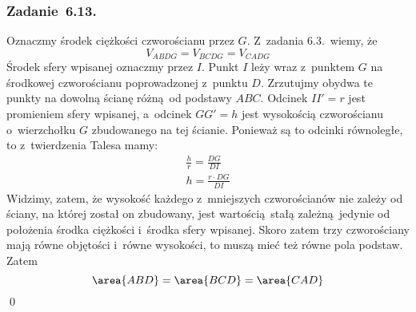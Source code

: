 \subsubsection*{Zadanie~6.13.}
Oznaczmy środek ciężkości czworościanu przez \(G\). Z~zadania 6.3.\ wiemy, że
\begin{equation*}
    V_{ABDG} = V_{BCDG} = V_{CADG}
\end{equation*}
Środek sfery wpisanej oznaczmy przez \(I\). Punkt \(I\) leży wraz z~punktem \(G\) na środkowej czworościanu poprowadzonej z~punktu \(D\). Zrzutujmy obydwa te punkty na dowolną ścianę różną od podstawy \(ABC\). Odcinek \(II' = r\) jest promieniem sfery wpisanej, a~odcinek \(GG' = h\) jest wysokością czworościanu o~wierzchołku \(G\) zbudowanego na tej ścianie. Ponieważ są to odcinki równoległe, to z~twierdzenia Talesa mamy:
\begin{gather*}
    \frac{h}{r} = \frac{DG}{DI}\\
    h = \frac{r \cdot DG}{DI}
\end{gather*}
Widzimy, zatem, że wysokość każdego z~mniejszych czworościanów nie zależy od ściany, na której został on zbudowany, jest wartością stałą zależną jedynie od położenia środka ciężkości i~środka sfery wpisanej. Skoro zatem trzy czworościany mają równe objętości i~równe wysokości, to muszą mieć też równe pola podstaw. Zatem
\begin{equation*}
    \area{ABD} = \area{BCD} = \area{CAD}
\end{equation*}
\qed

